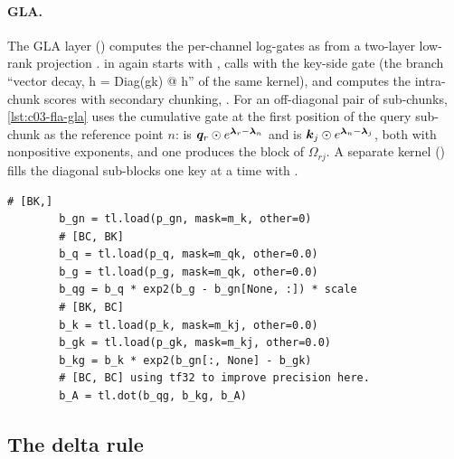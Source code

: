 \begin{sloppypar}
\paragraph{GLA.}
The GLA layer () computes the
per-channel log-gates as  from a two-layer
low-rank projection .  in
 again starts with
, calls  with the key-side gate
 (the branch ``vector decay, h = Diag(gk) @ h'' of the same kernel), and computes the
intra-chunk scores with secondary chunking, . For an off-diagonal pair of
sub-chunks, \cref{lst:c03-fla-gla} uses the cumulative gate  at the first position of
the query sub-chunk as the reference point $n$:  is $\bm{q}_r\odot e^{\bm\lambda_r-\bm\lambda_n}$
and  is $\bm{k}_j\odot e^{\bm\lambda_n-\bm\lambda_j}$, both with nonpositive exponents,
and one  produces the block of $\Omega_{rj}$. A separate kernel
() fills the diagonal sub-blocks one key at a time
with .

\begin{lstlisting}[caption={Excerpt from \texttt{repos/\allowbreak fla-org\_\_flash-linear-attention/\allowbreak fla/\allowbreak ops/\allowbreak gla/\allowbreak chunk.py} (kernel \texttt{chunk\_gla\_fwd\_A\_kernel\_intra\_sub\_inter}).},label={lst:c03-fla-gla}]
        # [BK,]
        b_gn = tl.load(p_gn, mask=m_k, other=0)
        # [BC, BK]
        b_q = tl.load(p_q, mask=m_qk, other=0.0)
        b_g = tl.load(p_g, mask=m_qk, other=0.0)
        b_qg = b_q * exp2(b_g - b_gn[None, :]) * scale
        # [BK, BC]
        b_k = tl.load(p_k, mask=m_kj, other=0.0)
        b_gk = tl.load(p_gk, mask=m_kj, other=0.0)
        b_kg = b_k * exp2(b_gn[:, None] - b_gk)
        # [BC, BC] using tf32 to improve precision here.
        b_A = tl.dot(b_qg, b_kg, b_A)
\end{lstlisting}

\subsection{The delta rule}


\end{sloppypar}
